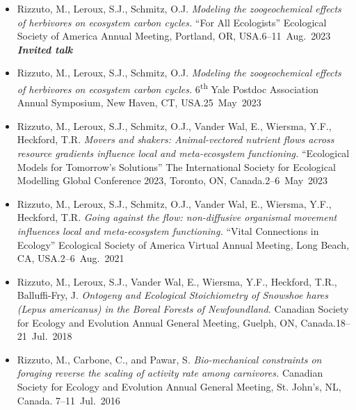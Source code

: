 


\begin{itemize}
  \item \textcolor{awesome}{Rizzuto, M.}, Leroux, S.J., Schmitz, O.J. \emph{Modeling the zoogeochemical effects of herbivores on ecosystem carbon cycles.} ``For All Ecologists'' Ecological Society of America Annual Meeting, Portland, OR, USA.\hfill 6--11~Aug.~2023 \\ \null\hfill\textbf{\textit{Invited talk}}  
  \item \textcolor{awesome}{Rizzuto, M.}, Leroux, S.J., Schmitz, O.J. \emph{Modeling the zoogeochemical effects of herbivores on ecosystem carbon cycles.} 6\textsuperscript{th} Yale Postdoc Association Annual Symposium, New Haven, CT, USA.\hfill 25~May~2023
  \item \textcolor{awesome}{Rizzuto, M.}, Leroux, S.J., Schmitz, O.J., Vander Wal, E., Wiersma, Y.F., Heckford, T.R. \emph{Movers and shakers: Animal-vectored nutrient flows across resource gradients influence local and meta-ecosystem functioning.} ``Ecological Models for Tomorrow's Solutions'' The International Society for Ecological Modelling Global Conference 2023, Toronto, ON, Canada.\hfill 2--6~May~2023
  \item \textcolor{awesome}{Rizzuto, M.}, Leroux, S.J., Schmitz, O.J., Vander Wal, E., Wiersma, Y.F., Heckford, T.R. \emph{Going against the flow: non-diffusive organismal movement influences local and meta-ecosystem functioning.} ``Vital Connections in Ecology'' Ecological Society of America Virtual Annual Meeting, Long Beach, CA, USA.\hfill 2--6~Aug.~2021
  \item \textcolor{awesome}{Rizzuto, M.}, Leroux, S.J., Vander Wal, E., Wiersma, Y.F., Heckford, T.R., Balluffi-Fry, J. \emph{Ontogeny and Ecological Stoichiometry of Snowshoe hares (Lepus americanus) in the Boreal Forests of Newfoundland.} Canadian Society for Ecology and Evolution Annual General Meeting, Guelph, ON, Canada.\hfill 18--21~Jul.~2018 
  \item \textcolor{awesome}{Rizzuto, M.}, Carbone, C., and Pawar, S. \emph{Bio-mechanical constraints on foraging reverse the scaling of activity rate among carnivores.} Canadian Society for Ecology and Evolution Annual General Meeting, St. John's, NL,\\ Canada. \hfill 7--11~Jul.~2016
\end{itemize}

